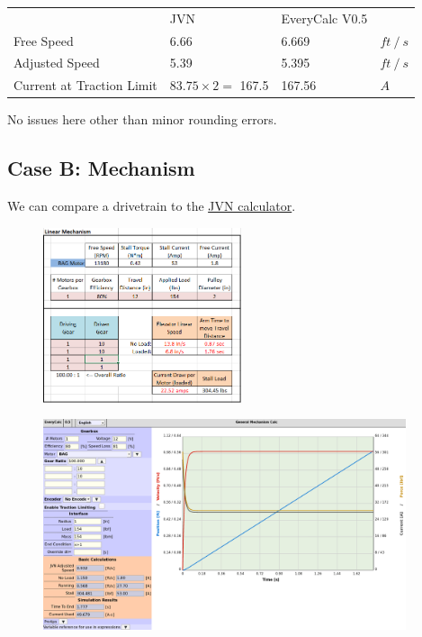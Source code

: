 \documentclass[10pt,letterpaper]{article}
\begin{document}
	\begin{table}[H]
	\begin{tabular}{llll}
	                & JVN & EveryCalc V0.5 & \\ \cline{1-4} 
	Free Speed      & 6.66 & 6.669 & $ft \ / \ s$ \\
	Adjusted Speed  & 5.39 & 5.395 & $ft \ / \ s$ \\
	Current at Traction Limit & $83.75 \times 2 =$ 167.5 & 167.56 & $A$
	\end{tabular}
	\end{table}

	No issues here other than minor rounding errors.

	\newpage
	\subsection*{Case B: Mechanism}
	We can compare a drivetrain to the \href{https://www.chiefdelphi.com/t/paper-jvns-mechanical-design-calculator-2016/146281}{\underline{JVN calculator}}.

	\begin{figure}[H]
		\includegraphics[width=0.52\textwidth]{validation/mechanism_JVN_B.png}
	\end{figure}

	\begin{figure}[H]
		\includegraphics[width=0.95\textwidth]{validation/mechanism_EC_B.png}
	\end{figure}
\end{document}
